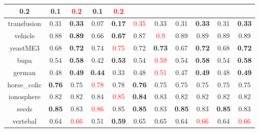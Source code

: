 \documentclass{article}%
\begin{document}
\begin{tabular}{c|cccccccccc}
{0.2
}&0.1&\textcolor{red}{ 
0.2
}&0.1&\textcolor{red}{ 
0.2
}\\%
\hline%
transfusion&0.31&\textbf{0.33}&0.07&\textbf{0.17}&\textcolor{red}{ 
0.35
}&0.33&0.31&\textbf{0.33}&0.31&\textbf{0.33}\\%
\hline%
vehicle&0.88&\textbf{0.89}&0.66&\textbf{0.67}&0.87&\textcolor{red}{ 
0.9
}&0.89&0.89&0.89&0.89\\%
\hline%
yeastME3&0.68&\textbf{0.72}&0.74&\textcolor{red}{ 
0.75
}&0.72&\textbf{0.73}&0.67&\textbf{0.72}&0.68&\textbf{0.72}\\%
\hline%
bupa&0.54&\textbf{0.58}&0.42&\textbf{0.53}&0.54&\textcolor{red}{ 
0.59
}&0.54&\textbf{0.58}&0.54&\textbf{0.58}\\%
\hline%
german&0.48&\textbf{0.49}&\textbf{0.44}&0.33&0.48&\textcolor{red}{ 
0.51
}&0.47&\textbf{0.49}&0.48&\textbf{0.49}\\%
\hline%
horse\_colic&\textbf{0.76}&0.75&\textcolor{red}{ 
0.78
}&0.78&\textbf{0.76}&0.75&0.75&0.75&0.75&0.75\\%
\hline%
ionosphere&0.82&0.82&0.84&\textcolor{red}{ 
0.85
}&\textbf{0.84}&0.83&0.82&0.82&0.82&0.82\\%
\hline%
seeds&\textbf{0.85}&0.83&\textcolor{red}{ 
0.86
}&0.85&\textbf{0.85}&0.83&\textbf{0.85}&0.83&\textbf{0.85}&0.83\\%
\hline%
vertebal&0.64&\textcolor{red}{ 
0.66
}&0.51&\textbf{0.59}&0.65&0.65&0.64&\textcolor{red}{ 
0.66
}&0.64&\textcolor{red}{ 
0.66
}\\%
\hline%
\end{tabular}

%
\end{document}
